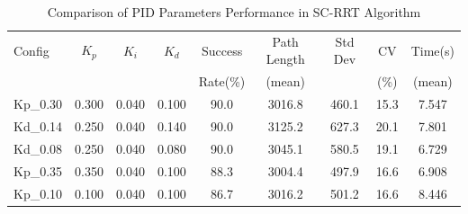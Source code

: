 
\begin{table}[htbp]
\centering
\caption{Comparison of PID Parameters Performance in SC-RRT Algorithm}
\label{tab:pid_comparison}
\begin{tabular}{lcccccccc}
\hline
Config & $K_p$ & $K_i$ & $K_d$ & Success & Path Length & Std Dev & CV & Time(s) \\
 & & & & Rate(\%) & (mean) & & (\%) & (mean) \\
\hline
Kp\_0.30 & 0.300 & 0.040 & 0.100 & 90.0 & 3016.8 & 460.1 & 15.3 & 7.547 \\
Kd\_0.14 & 0.250 & 0.040 & 0.140 & 90.0 & 3125.2 & 627.3 & 20.1 & 7.801 \\
Kd\_0.08 & 0.250 & 0.040 & 0.080 & 90.0 & 3045.1 & 580.5 & 19.1 & 6.729 \\
Kp\_0.35 & 0.350 & 0.040 & 0.100 & 88.3 & 3004.4 & 497.9 & 16.6 & 6.908 \\
Kp\_0.10 & 0.100 & 0.040 & 0.100 & 86.7 & 3016.2 & 501.2 & 16.6 & 8.446 \\
\hline
\end{tabular}
\end{table}


